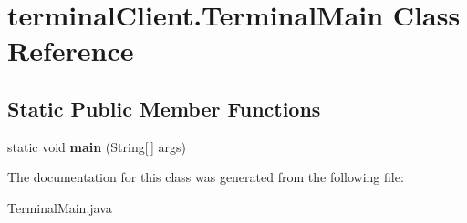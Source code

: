 \hypertarget{classterminalClient_1_1TerminalMain}{}\section{terminal\+Client.\+Terminal\+Main Class Reference}
\label{classterminalClient_1_1TerminalMain}
\subsection*{Static Public Member Functions}
\begin{DoxyCompactItemize}
\item 
\mbox{\label{classterminalClient_1_1TerminalMain_a8152b318f8e64093d4da2e08b1628056}} 
static void {\bfseries main} (String\mbox{[}$\,$\mbox{]} args)
\end{DoxyCompactItemize}


The documentation for this class was generated from the following file\+:\begin{DoxyCompactItemize}
\item 
Terminal\+Main.\+java\end{DoxyCompactItemize}
